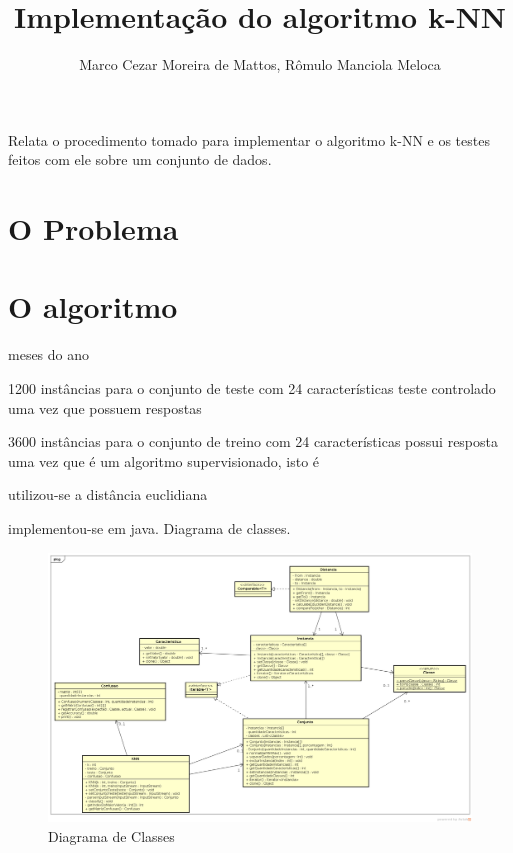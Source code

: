 \documentclass[12pt]{article}
\title{Implementação do algoritmo k-NN}
\author{Marco Cezar Moreira de Mattos\inst{1}, Rômulo Manciola Meloca\inst{1}}
\begin{document}
	\maketitle

	\begin{resumo}
		Relata o procedimento tomado para implementar o algoritmo k-NN e os testes feitos com ele sobre um conjunto de dados.
	\end{resumo}

	\section{O Problema}\label{sec:problema}
		

	\section{O algoritmo}\label{sec:algoritmo}


		meses do ano

		1200 instâncias para o conjunto de teste com 24 características
		teste controlado uma vez que possuem respostas

		3600 instâncias para o conjunto de treino com 24 características
		possui resposta uma vez que é um algoritmo supervisionado, isto é

		utilizou-se a distância euclidiana

		implementou-se em java.
		Diagrama de classes.

\begin{landscape}
\centering
\begin{figure}[p]
\includegraphics[width=1.4\textwidth]{classDiagram.png}
\caption{Diagrama de Classes}
\label{fig:classDiagram}
\end{figure}
\end{landscape}
\restoregeometry
\end{document}

